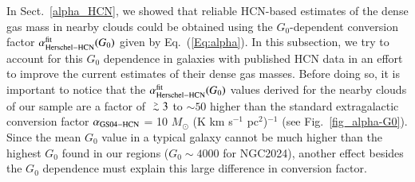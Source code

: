 \documentclass{aa}
\def\gtsima{$\; \buildrel > \over \sim \;$}
\def\simgt{\lower.5ex\hbox{\gtsima}}
\begin{document}
{In Sect.~\ref{alpha_HCN}, we showed that reliable HCN-based estimates of the dense gas mass in nearby clouds could be obtained 
using the $G_0$-dependent conversion factor $\alpha_{\rm Herschel-HCN}^{\rm fit}(G_0)$ given by Eq.~(\ref{Eq:alpha}). 
In this subsection, we try to account for this $G_0$ dependence in galaxies with published HCN data 
in an effort to improve the current estimates of their dense gas masses. 
Before doing so, it is important to notice that the $\alpha_{\rm Herschel-HCN}^{\rm fit}(G_0)$ values derived for the nearby clouds 
of our sample are a factor of $\simgt 3$ to $\sim 50$ higher than the standard extragalactic conversion factor 
$\alpha_{\rm GS04-HCN}$ = 10 $M_{\odot}$ (K km s$^{-1}$ pc$^2$)$^{-1}$ (see Fig.~\ref{fig_alpha-G0}). 
Since the mean $G_0$ value in a typical galaxy cannot be much higher than the highest $G_0$ found in our regions ($G_0 \sim 4000$ for NGC2024),
another effect besides the $G_0$ dependence must explain this large difference in conversion factor. 

}
\end{document}
